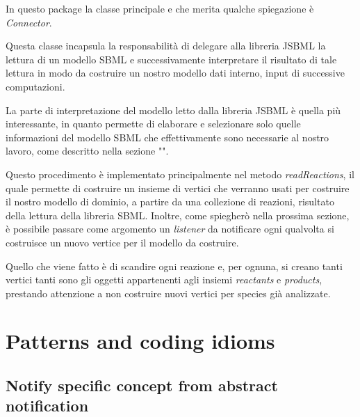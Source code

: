 In questo package la classe principale e che merita qualche
spiegazione \`e \emph{Connector}.

Questa classe incapsula la responsabilit\`a di delegare alla libreria
JSBML la lettura di un modello SBML e successivamente interpretare il
risultato di tale lettura in modo da costruire un nostro modello dati
interno, input di successive computazioni.

La parte di interpretazione del modello letto dalla libreria JSBML \`e
quella pi\`u interessante, in quanto permette di elaborare e
selezionare solo quelle informazioni del modello SBML che
effettivamente sono necessarie al nostro lavoro, come descritto nella
sezione "". 

Questo procedimento \`e implementato principalmente nel metodo
\emph{readReactions}, il quale permette di costruire un insieme di
vertici che verranno usati per costruire il nostro modello di dominio,
a partire da una collezione di reazioni, risultato della lettura della
libreria SBML. Inoltre, come spiegher\`o nella prossima sezione, \`e
possibile passare come argomento un \emph{listener} da notificare ogni
qualvolta si costruisce un nuovo vertice per il modello da costruire.

Quello che viene fatto \`e di scandire ogni reazione e, per ognuna, si
creano tanti vertici tanti sono gli oggetti appartenenti agli insiemi
\emph{reactants} e \emph{products}, prestando attenzione a non
costruire nuovi vertici per species gi\`a analizzate.

\section{Patterns and coding idioms}

\subsection{Notify specific concept from abstract notification}

